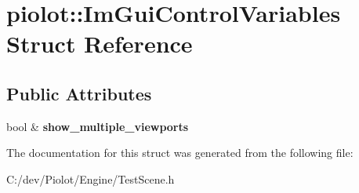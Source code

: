 \hypertarget{structpiolot_1_1_im_gui_control_variables}{}\section{piolot\+:\+:Im\+Gui\+Control\+Variables Struct Reference}
\label{structpiolot_1_1_im_gui_control_variables}
\subsection*{Public Attributes}
\begin{DoxyCompactItemize}
\item 
\mbox{\label{structpiolot_1_1_im_gui_control_variables_ae4b05c60d0566aae16e8ab68980b473d}} 
bool \& {\bfseries show\+\_\+multiple\+\_\+viewports}
\end{DoxyCompactItemize}


The documentation for this struct was generated from the following file\+:\begin{DoxyCompactItemize}
\item 
C\+:/dev/\+Piolot/\+Engine/Test\+Scene.\+h\end{DoxyCompactItemize}
